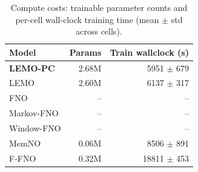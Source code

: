\begin{table}[h]
\centering
\caption{Compute costs: trainable parameter counts and per-cell wall-clock training time (mean $\pm$ std across cells).}
\label{tab:compute-costs}
\begin{tabular}{lrr}
\toprule
Model & Params & Train wallclock (s) \\
\midrule
\textbf{LEMO-PC} & 2.68M & 5951 $\pm$ 679 \\
LEMO & 2.60M & 6137 $\pm$ 317 \\
FNO & -- & -- \\
Markov-FNO & -- & -- \\
Window-FNO & -- & -- \\
MemNO & 0.06M & 8506 $\pm$ 891 \\
F-FNO & 0.32M & 18811 $\pm$ 453 \\
\bottomrule
\end{tabular}
\end{table}